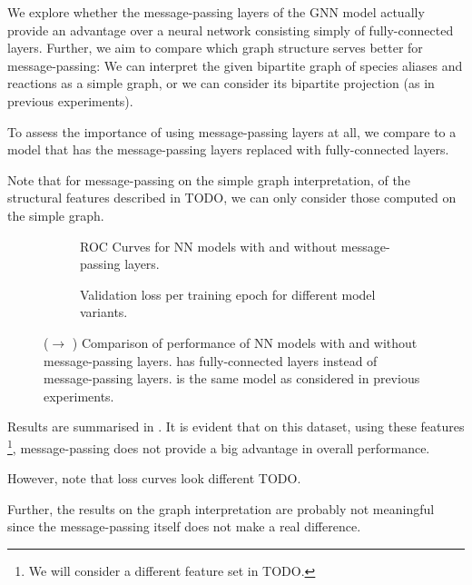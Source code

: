 \documentclass[
	fontsize=10pt, %
	twoside=false, %
	secnumdepth=1, %
  toc=indentunnumbered %
]{kaobook}
\begin{document}
We explore whether the message-passing layers of the GNN model actually provide
an advantage over a neural network
consisting simply of fully-connected layers. Further, we aim to compare which
graph structure serves better for message-passing: We can interpret the given
bipartite graph of species aliases and reactions as a simple graph, or we can
consider its bipartite projection (as in previous experiments).

To assess the importance of using message-passing layers at all, we compare to a
model that has the message-passing layers replaced with fully-connected layers.

Note that for message-passing on the simple graph interpretation, of the
structural features described in TODO, we can only consider those computed on
the simple graph.

\begin{figure}[h]
  \centering
  \begin{subfigure}[h]{0.48\linewidth}
    \caption{ROC Curves for NN models with and without message-passing layers.}
  \end{subfigure}
  \begin{subfigure}[h]{0.48\linewidth}
    \caption{Validation loss per training epoch for different model variants.}
  \end{subfigure}
  \caption{(\ADLast $\rightarrow$ \PDMap) Comparison of performance of NN models
    with and without message-passing layers.  has
    fully-connected layers instead of message-passing layers.
     is the same model as considered in previous
    experiments. }
  \label{fig:importance-message-passing}
\end{figure}

Results are summarised in . It is evident
that on this dataset, using these features
\footnote{
  We will consider a different feature set in TODO.
},
message-passing does not provide a big advantage in overall performance.

However, note that loss curves look different TODO.

Further, the results on the graph interpretation are probably not meaningful
since the message-passing itself does not make a real difference.
\end{document}
